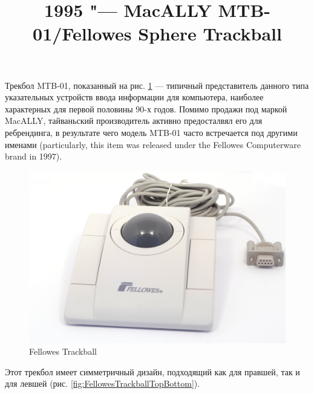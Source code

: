 \documentclass[11pt, a4paper]{article}
\begin{document}
\title{1995 "--- MacALLY MTB-01/Fellowes Sphere Trackball}
\date{}
\maketitle
{}
Трекбол MTB-01, показанный на рис. \ref{fig:FellowesTrackballPic} — типичный представитель данного типа указательных устройств ввода информации для компьютера, наиболее характерных для первой половины 90-х годов. Помимо продажи под маркой MacALLY, тайваньский производитель активно предосталвял его для ребрендинга, в результате чего модель MTB-01 часто встречается под другими именами (particularly, this item was released under the Fellowes Computerware brand in 1997).

\begin{figure}[h]
    \centering
    \includegraphics[scale=0.5]{1995_fellowes_trackball/pic_30.jpg}
    \caption{Fellowes Trackball}
    \label{fig:FellowesTrackballPic}
\end{figure}

Этот трекбол имеет симметричный дизайн, подходящий как для правшей, так и для левшей (рис. \ref{fig:FellowesTrackballTopBottom}). 
\end{document}
